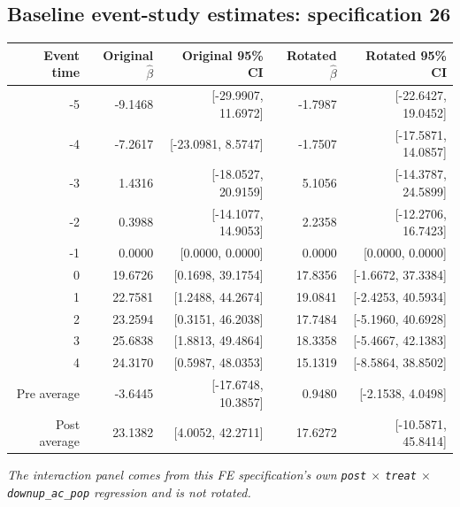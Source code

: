 \documentclass[10pt]{article}
\begin{document}
\subsection*{Baseline event-study estimates: specification 26}
\begin{center}
\scriptsize
\begin{tabular}{r rr rr}
\toprule
Event time & Original $\hat\beta$ & Original 95\% CI & Rotated $\hat\beta$ & Rotated 95\% CI \\
\midrule
-5 & -9.1468 & [-29.9907, 11.6972] & -1.7987 & [-22.6427, 19.0452] \\
-4 & -7.2617 & [-23.0981, 8.5747] & -1.7507 & [-17.5871, 14.0857] \\
-3 & 1.4316 & [-18.0527, 20.9159] & 5.1056 & [-14.3787, 24.5899] \\
-2 & 0.3988 & [-14.1077, 14.9053] & 2.2358 & [-12.2706, 16.7423] \\
-1 & 0.0000 & [0.0000, 0.0000] & 0.0000 & [0.0000, 0.0000] \\
0 & 19.6726 & [0.1698, 39.1754] & 17.8356 & [-1.6672, 37.3384] \\
1 & 22.7581 & [1.2488, 44.2674] & 19.0841 & [-2.4253, 40.5934] \\
2 & 23.2594 & [0.3151, 46.2038] & 17.7484 & [-5.1960, 40.6928] \\
3 & 25.6838 & [1.8813, 49.4864] & 18.3358 & [-5.4667, 42.1383] \\
4 & 24.3170 & [0.5987, 48.0353] & 15.1319 & [-8.5864, 38.8502] \\
\midrule
Pre average & -3.6445 & [-17.6748, 10.3857] & 0.9480 & [-2.1538, 4.0498] \\
Post average & 23.1382 & [4.0052, 42.2711] & 17.6272 & [-10.5871, 45.8414] \\
\bottomrule
\end{tabular}
\end{center}
\medskip
\textit{The interaction panel comes from this FE specification's own \texttt{post} $\times$ \texttt{treat} $\times$ \texttt{downup\_ac\_pop} regression and is not rotated.}
\clearpage
\end{document}
